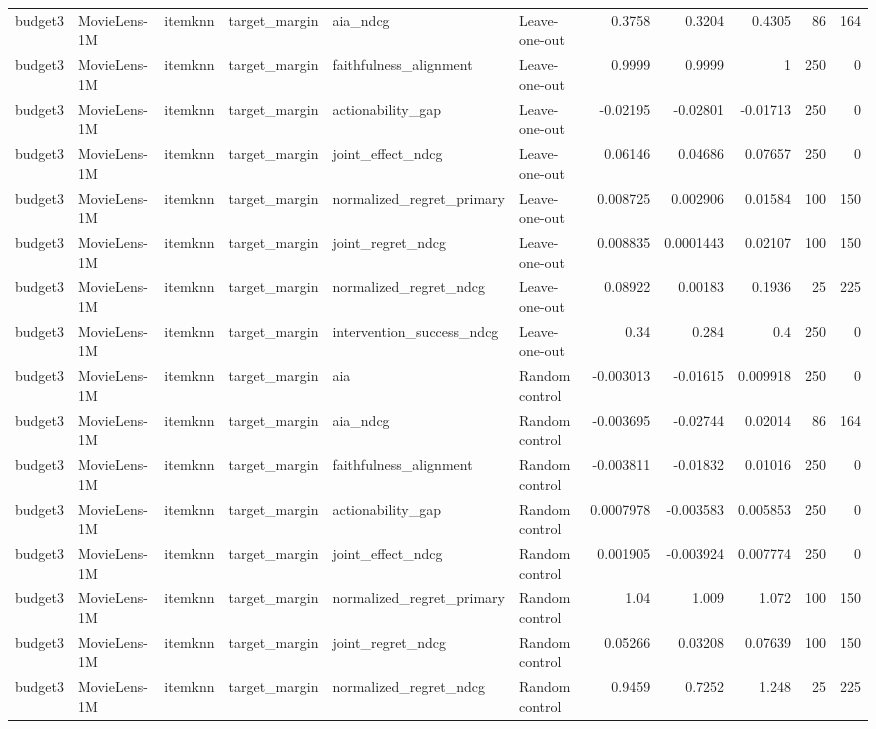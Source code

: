 \begin{table}[t]
{\begin{tabular}{llllllrrrrr}
budget3 & MovieLens-1M & itemknn & target\_margin & aia\_ndcg & Leave-one-out & 0.3758 & 0.3204 & 0.4305 & 86 & 164 \\
budget3 & MovieLens-1M & itemknn & target\_margin & faithfulness\_alignment & Leave-one-out & 0.9999 & 0.9999 & 1 & 250 & 0 \\
budget3 & MovieLens-1M & itemknn & target\_margin & actionability\_gap & Leave-one-out & -0.02195 & -0.02801 & -0.01713 & 250 & 0 \\
budget3 & MovieLens-1M & itemknn & target\_margin & joint\_effect\_ndcg & Leave-one-out & 0.06146 & 0.04686 & 0.07657 & 250 & 0 \\
budget3 & MovieLens-1M & itemknn & target\_margin & normalized\_regret\_primary & Leave-one-out & 0.008725 & 0.002906 & 0.01584 & 100 & 150 \\
budget3 & MovieLens-1M & itemknn & target\_margin & joint\_regret\_ndcg & Leave-one-out & 0.008835 & 0.0001443 & 0.02107 & 100 & 150 \\
budget3 & MovieLens-1M & itemknn & target\_margin & normalized\_regret\_ndcg & Leave-one-out & 0.08922 & 0.00183 & 0.1936 & 25 & 225 \\
budget3 & MovieLens-1M & itemknn & target\_margin & intervention\_success\_ndcg & Leave-one-out & 0.34 & 0.284 & 0.4 & 250 & 0 \\
budget3 & MovieLens-1M & itemknn & target\_margin & aia & Random control & -0.003013 & -0.01615 & 0.009918 & 250 & 0 \\
budget3 & MovieLens-1M & itemknn & target\_margin & aia\_ndcg & Random control & -0.003695 & -0.02744 & 0.02014 & 86 & 164 \\
budget3 & MovieLens-1M & itemknn & target\_margin & faithfulness\_alignment & Random control & -0.003811 & -0.01832 & 0.01016 & 250 & 0 \\
budget3 & MovieLens-1M & itemknn & target\_margin & actionability\_gap & Random control & 0.0007978 & -0.003583 & 0.005853 & 250 & 0 \\
budget3 & MovieLens-1M & itemknn & target\_margin & joint\_effect\_ndcg & Random control & 0.001905 & -0.003924 & 0.007774 & 250 & 0 \\
budget3 & MovieLens-1M & itemknn & target\_margin & normalized\_regret\_primary & Random control & 1.04 & 1.009 & 1.072 & 100 & 150 \\
budget3 & MovieLens-1M & itemknn & target\_margin & joint\_regret\_ndcg & Random control & 0.05266 & 0.03208 & 0.07639 & 100 & 150 \\
budget3 & MovieLens-1M & itemknn & target\_margin & normalized\_regret\_ndcg & Random control & 0.9459 & 0.7252 & 1.248 & 25 & 225 \\

\end{tabular}}
\end{table}

